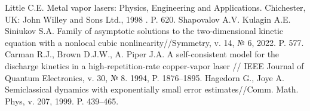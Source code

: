 %



\begin{thebibliography}{9} %
 Little C.E. Metal vapor lasers: Physics, Engineering and Applications.  Chichester, UK: John Willey and Sons Ltd., 1998 . P. 620.
 Shapovalov A.V. Kulagin A.E. Siniukov S.A. Family of asymptotic solutions to the two-dimensional kinetic equation with a nonlocal cubic nonlinearity//Symmetry, v. 14, № 6, 2022. P. 577.
 Carman R.J., Brown D.J.W., A. Piper J.A. A self-consistent model for the discharge kinetics in a high-repetition-rate copper-vapor laser // IEEE Journal of Quantum Electronics, v. 30, № 8. 1994, P. 1876--1895.
 Hagedorn G., Joye A. Semiclassical dynamics with exponentially small error estimates//Comm. Math.  Phys, v. 207, 1999. P. 439--465.
\end{thebibliography}





%
